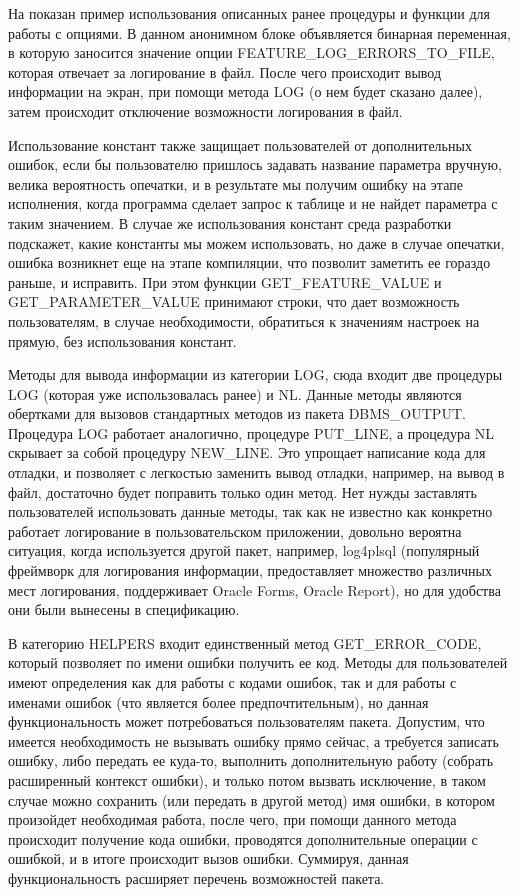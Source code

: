 На  показан пример использования описанных ранее процедуры и функции для работы с опциями. В данном анонимном блоке объявляется бинарная переменная, в которую заносится значение опции FEATURE\_LOG\_ERRORS\_TO\_FILE, которая отвечает за логирование в файл. После чего происходит вывод информации на экран, при помощи метода LOG (о нем будет сказано далее), затем происходит отключение возможности логирования в файл.

Использование констант также защищает пользователей от дополнительных ошибок, если бы пользователю пришлось задавать название параметра вручную, велика вероятность опечатки, и в результате мы получим ошибку на этапе исполнения, когда программа сделает запрос к таблице и не найдет параметра с таким значением. В случае же использования констант среда разработки подскажет, какие константы мы можем использовать, но даже в случае опечатки, ошибка возникнет еще на этапе компиляции, что позволит заметить ее гораздо раньше, и исправить. При этом функции GET\_FEATURE\_VALUE и GET\_PARAMETER\_VALUE принимают строки, что дает возможность пользователям, в случае необходимости, обратиться к значениям настроек на прямую, без использования констант. 

Методы для вывода информации из категории LOG, сюда входит две процедуры LOG (которая уже использовалась ранее) и NL. Данные методы являются обертками для вызовов стандартных методов из пакета DBMS\_OUTPUT. Процедура LOG работает аналогично, процедуре PUT\_LINE, а процедура NL скрывает за собой процедуру NEW\_LINE. Это упрощает написание кода для отладки, и позволяет с легкостью заменить вывод отладки, например, на вывод в файл, достаточно будет поправить только один метод. Нет нужды заставлять пользователей использовать данные методы, так как не известно как конкретно работает логирование в пользовательском приложении, довольно вероятна ситуация, когда используется другой пакет, например, log4plsql (популярный фреймворк для логирования информации, предоставляет множество различных мест логирования, поддерживает Oracle Forms, Oracle Report\cite{log4plsql}), но для удобства они были вынесены в спецификацию.

В категорию HELPERS входит единственный метод GET\_ERROR\_CODE, который позволяет по имени ошибки получить ее код. Методы для пользователей имеют определения как для работы с кодами ошибок, так и для работы с именами ошибок (что является более предпочтительным), но данная функциональность может потребоваться пользователям пакета. Допустим, что имеется необходимость не вызывать ошибку прямо сейчас, а требуется записать ошибку, либо передать ее куда-то, выполнить дополнительную работу (собрать расширенный контекст ошибки), и только потом вызвать исключение, в таком случае можно сохранить (или передать в другой метод) имя ошибки, в котором произойдет необходимая работа, после чего, при помощи данного метода происходит получение кода ошибки, проводятся дополнительные операции с ошибкой, и в итоге происходит вызов ошибки. Суммируя, данная функциональность расширяет перечень возможностей пакета. 

